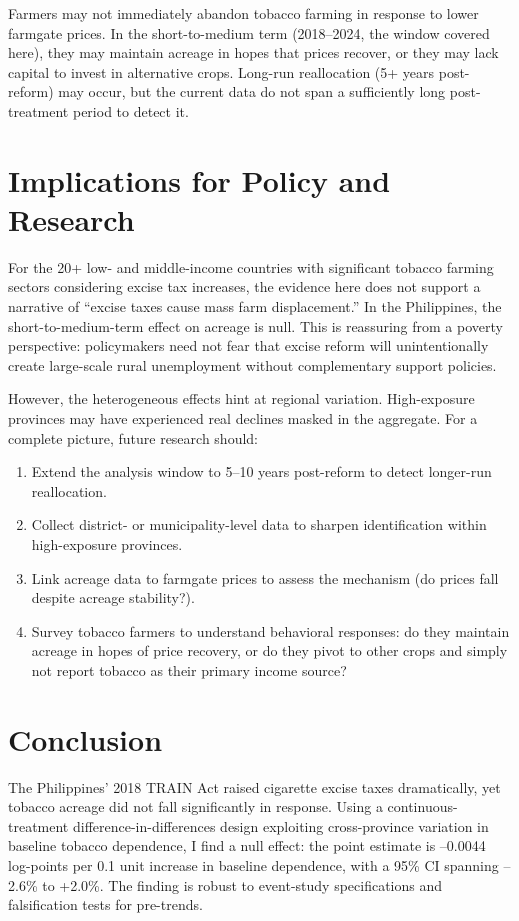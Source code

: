 \documentclass[12pt]{article}
\begin{document}
Farmers may not immediately abandon tobacco farming in response to lower farmgate prices. In the short-to-medium term (2018--2024, the window covered here), they may maintain acreage in hopes that prices recover, or they may lack capital to invest in alternative crops. Long-run reallocation (5+ years post-reform) may occur, but the current data do not span a sufficiently long post-treatment period to detect it.

\section{Implications for Policy and Research}

For the 20+ low- and middle-income countries with significant tobacco farming sectors considering excise tax increases, the evidence here does not support a narrative of ``excise taxes cause mass farm displacement.'' In the Philippines, the short-to-medium-term effect on acreage is null. This is reassuring from a poverty perspective: policymakers need not fear that excise reform will unintentionally create large-scale rural unemployment without complementary support policies.

However, the heterogeneous effects hint at regional variation. High-exposure provinces may have experienced real declines masked in the aggregate. For a complete picture, future research should:
\begin{enumerate}
\item Extend the analysis window to 5--10 years post-reform to detect longer-run reallocation.
\item Collect district- or municipality-level data to sharpen identification within high-exposure provinces.
\item Link acreage data to farmgate prices to assess the mechanism (do prices fall despite acreage stability?).
\item Survey tobacco farmers to understand behavioral responses: do they maintain acreage in hopes of price recovery, or do they pivot to other crops and simply not report tobacco as their primary income source?
\end{enumerate}

\section{Conclusion} \label{apep_main_text_end}

The Philippines' 2018 TRAIN Act raised cigarette excise taxes dramatically, yet tobacco acreage did not fall significantly in response. Using a continuous-treatment difference-in-differences design exploiting cross-province variation in baseline tobacco dependence, I find a null effect: the point estimate is --0.0044 log-points per 0.1 unit increase in baseline dependence, with a 95\% CI spanning --2.6\% to +2.0\%. The finding is robust to event-study specifications and falsification tests for pre-trends.
\end{document}
